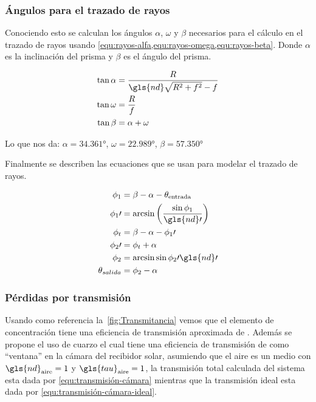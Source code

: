 			\subsubsection{Ángulos para el trazado de rayos}
			
				Conociendo esto se calculan los ángulos $\alpha$, $\omega$ y $\beta$ necesarios para el cálculo en el trazado de rayos usando \cref{equ:rayos-alfa,equ:rayos-omega,equ:rayos-beta}. Donde $\alpha$ es la inclinación del prisma y $\beta$ es el ángulo del prisma.
				
				\begin{align}
					\tan\alpha &= \dfrac{R}{\gls{nd}\sqrt{R^{2}+f^{2}} - f} \label{equ:rayos-alfa}\\
					\tan\omega &= \dfrac{R}{f} \label{equ:rayos-omega}\\
					\tan\beta &= \alpha + \omega \label{equ:rayos-beta}
				\end{align}
				
				Lo que nos da: $\alpha= \ang{34.361}$, $\omega = \ang{22.989}$, $\beta= \ang{57.350}$
				
				Finalmente se describen las ecuaciones que se usan para modelar el trazado de rayos.
				
				\begin{align}
					\phi_{1} &= \beta - \alpha - \theta_{\text{entrada}}\\
					\phi_{1}\prime &= \arcsin\left(\dfrac{\sin\phi_{1}}{\gls{nd}\prime}\right)\\
					\phi_{t} &= \beta - \alpha - \phi_{1}\prime\\
					\phi_{2}\prime &= \phi_{t} + \alpha\\
					\phi_{2} &= \arcsin{\sin\phi_{2}\prime\gls{nd}\prime}\\
					\theta_{salida} &= \phi_{2} - \alpha
				\end{align}
				
			\subsubsection{Pérdidas por transmisión}
					
					Usando como referencia la~\cref{fig:Transmitancia} vemos que el elemento de concentración tiene una eficiencia de transmisión aproximada de . Además se propone el uso de cuarzo el cual tiene una eficiencia de transmisión de  como ``ventana'' en la cámara del recibidor solar, asumiendo que el aire es un medio con $\gls{nd}_{\text{aire}} = 1$ y $\gls{tau}_{\text{aire}} = 1$, la transmisión total calculada del sistema esta dada por \eqref{equ:transmisión-cámara} mientras que la transmisión ideal esta dada por \cref{equ:transmisión-cámara-ideal}.
			

